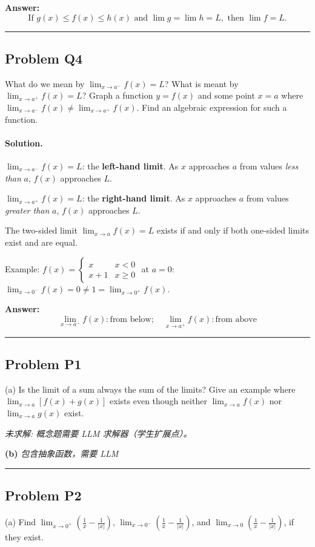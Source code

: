 \documentclass[12pt, a4paper]{article}
\newcommand{\problem}[1]{\subsection*{Problem #1}}
\newcommand{\solution}{\paragraph{Solution.}}
\begin{document}
\textbf{Answer:}
\[\boxed{\text{If } g(x) \le f(x) \le h(x) \text{ and } \lim g = \lim h = L, \text{ then } \lim f = L.}\]

\vspace{1em}
\hrule
\vspace{1em}

\problem{Q4}

What do we mean by $\lim_{x \to a^-} f(x) = L$? What is meant by $\lim_{x \to a^+} f(x) = L$? Graph a function $y = f(x)$ and some point $x = a$ where $\lim_{x \to a^-} f(x) \neq \lim_{x \to a^+} f(x)$. Find an algebraic expression for such a function.

\solution

$\lim_{x \to a^-} f(x) = L$: the \textbf{left-hand limit}. As $x$ approaches $a$ from values \emph{less than} $a$, $f(x)$ approaches $L$.

$\lim_{x \to a^+} f(x) = L$: the \textbf{right-hand limit}. As $x$ approaches $a$ from values \emph{greater than} $a$, $f(x)$ approaches $L$.

The two-sided limit $\lim_{x \to a} f(x) = L$ exists if and only if both one-sided limits exist and are equal.

Example: $f(x) = \begin{cases} x & x < 0 \\ x+1 & x \ge 0 \end{cases}$ at $a = 0$: $\lim_{x \to 0^-} f(x) = 0 \neq 1 = \lim_{x \to 0^+} f(x)$.

\textbf{Answer:}
\[\boxed{\lim_{x \to a^-} f(x): \text{from below}; \quad \lim_{x \to a^+} f(x): \text{from above}}\]

\vspace{1em}
\hrule
\vspace{1em}

\problem{P1}

(a) Is the limit of a sum always the sum of the limits? Give an example where $\lim_{x \to a}[f(x) + g(x)]$ exists even though neither $\lim_{x \to a} f(x)$ nor $\lim_{x \to a} g(x)$ exist.

\textit{\color{red} 未求解: 概念题需要 LLM 求解器（学生扩展点）。}

\textbf{(b)}
\textit{\color{red} 包含抽象函数，需要 LLM}

\vspace{1em}
\hrule
\vspace{1em}

\problem{P2}

(a) Find $\lim_{x \to 0^+}(\frac{1}{x} - \frac{1}{|x|})$, $\lim_{x \to 0^-}(\frac{1}{x} - \frac{1}{|x|})$, and $\lim_{x \to 0}(\frac{1}{x} - \frac{1}{|x|})$, if they exist.
\end{document}
